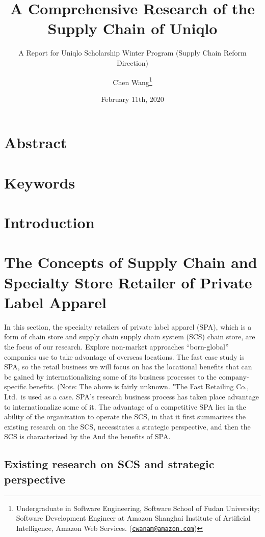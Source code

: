 \documentclass[]{article}
\title{A Comprehensive Research of the Supply Chain of Uniqlo}
\subtitle{A Report for Uniqlo Scholarship Winter Program (Supply Chain Reform
Direction)}
\author{Chen Wang\footnote{Undergraduate in Software Engineering, Software
  School of Fudan University; Software Development Engineer at Amazon
  Shanghai Institute of Artificial Intelligence, Amazon Web Services.
  (\href{mailto:cwanam@amazon.com}{\nolinkurl{cwanam@amazon.com}})}}
\date{February 11th, 2020}
\begin{document}
\maketitle

{
\setcounter{tocdepth}{3}
\tableofcontents
}
\hypertarget{abstract}{%
\section{Abstract}\label{abstract}}

\hypertarget{keywords}{%
\section{Keywords}\label{keywords}}

\hypertarget{introduction}{%
\section{Introduction}\label{introduction}}

\hypertarget{the-concepts-of-supply-chain-and-specialty-store-retailer-of-private-label-apparel}{%
\section{The Concepts of Supply Chain and Specialty Store Retailer of
Private Label
Apparel}\label{the-concepts-of-supply-chain-and-specialty-store-retailer-of-private-label-apparel}}

In this section, the specialty retailers of private label apparel (SPA),
which is a form of chain store and supply chain supply chain system
(SCS) chain store, are the focus of our research. Explore non-market
approaches ``born-global'' companies use to take advantage of overseas
locations. The fast case study is SPA, so the retail business we will
focus on has the locational benefits that can be gained by
internationalizing some of its business processes to the
company-specific benefits. (Note: The above is fairly unknown. "The Fast
Retailing Co., Ltd.~is used as a case. SPA's research business process
has taken place advantage to internationalize some of it. The advantage
of a competitive SPA lies in the ability of the organization to operate
the SCS, in that it first summarizes the existing research on the SCS,
necessitates a strategic perspective, and then the SCS is characterized
by the And the benefits of SPA.

\hypertarget{existing-research-on-scs-and-strategic-perspective}{%
\subsection{Existing research on SCS and strategic
perspective}\label{existing-research-on-scs-and-strategic-perspective}}
\end{document}
